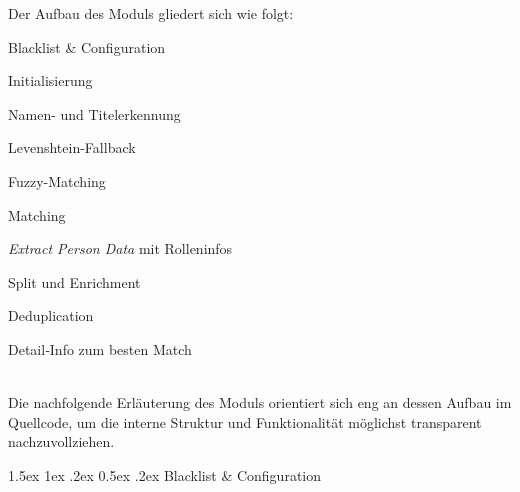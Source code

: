 \documentclass[12pt, a4paper, ngerman, bidi=default]{article}
\makeatletter
\let\oldparagraph\paragraph%
\renewcommand{\paragraph}{
    \@ifstar%
      \xxxParagraphStar%
      \xxxParagraphNoStar%
 }
\newcommand{\xxxParagraphStar}[1]{\oldparagraph*{#1}\mbox{}}
\newcommand{\xxxParagraphNoStar}[1]{\oldparagraph{#1}\mbox{}}
\renewcommand\paragraph{\@startsection{paragraph}{4}{0em}%
  {1.5ex \@plus1ex \@minus.2ex}%
  {0.5ex \@plus.2ex}%
  {\normalfont\normalsize\bfseries\itshape}}
\makeatother
\begin{document}
Der Aufbau des Moduls gliedert sich wie folgt:\\[0.5em]
\begin{minipage}[t]{0.45\textwidth}
  \justifying
  \begin{enumerate}\small{
    \item Blacklist \& Configuration 
    \item Initialisierung
    \item Namen- und Titelerkennung
    \item Levenshtein-Fallback
    \item Fuzzy-Matching}
  \end{enumerate}
\end{minipage}
\hfill
\begin{minipage}[t]{0.48\textwidth}
  \vspace*{0cm}
  \justifying
  \begin{enumerate}
    \setcounter{enumi}{5}
    \small{
    \item Matching
    \item \textit{Extract Person Data} mit Rolleninfos
    \item Split und Enrichment
    \item Deduplication 
    \item Detail‑Info zum besten Match}
  \end{enumerate}
\end{minipage}
\vspace*{0.4cm}\\

Die nachfolgende Erläuterung des Moduls orientiert sich eng an dessen Aufbau im Quellcode, um die interne Struktur und Funktionalität möglichst transparent nachzuvollziehen.

\paragraph{Blacklist \& Configuration}\label{paragraph:Pers_match/Blacklist}
\end{document}

